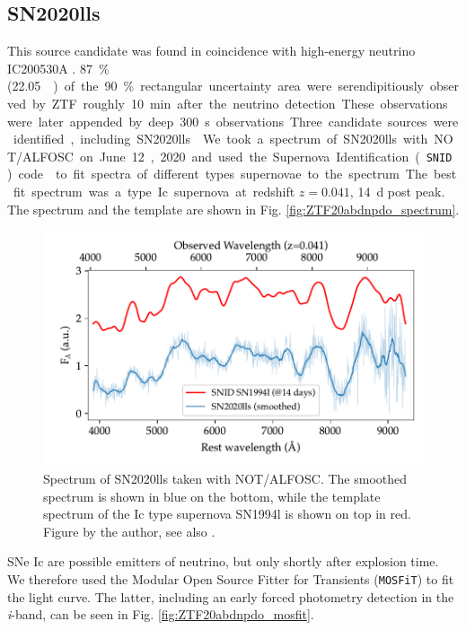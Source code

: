 \documentclass[
    a4paper, %
    fontsize=10pt, %
    twoside=true, %
    numbers=noenddot, %
    fontmethod=tex,
]{kaobook}
\begin{document}
\subsection{SN2020lls} \label{SN2020lls}
This source candidate was found in coincidence with high-energy neutrino IC200530A . \SI{87}{\percent} (\SI{22.05}{\square\deg}) of the \SI{90}{\percent} rectangular uncertainty area were serendipitiously observed by ZTF roughly \SI{10}{\minute} after the neutrino detection. These observations were later appended by deep \SI{300}{\second} observations Three candidate sources were identified, including SN2020lls . 

We took a spectrum of SN2020lls with NOT/ALFOSC on June 12, 2020 and used the Supernova Identification (\texttt{SNID}) code  to fit spectra of different types supernovae to the spectrum. The best fit spectrum was a type Ic supernova at redshift $z=0.041$, \SI{14}{\day} post peak. The spectrum and the template are shown in Fig. \ref{fig:ZTF20abdnpdo_spectrum}. 

\begin{figure}[h!]
    \includegraphics[width=1\textwidth]{fu/ZTF20abdnpdo_not_spectrum.pdf}
    \caption[SN2020lls spectrum]{Spectrum of SN2020lls taken with NOT/ALFOSC. The smoothed spectrum is shown in blue on the bottom, while the template spectrum of the Ic type supernova SN1994l is shown on top in red. Figure by the author, see also \cite{Stein2023a}.}
\end{figure}
SNe Ic are possible emitters of neutrino, but only shortly after explosion time. We therefore used the Modular Open Source Fitter for Transients (\texttt{MOSFiT})  to fit the light curve. The latter, including an early forced photometry detection in the \textit{i}-band, can be seen in Fig. \ref{fig:ZTF20abdnpdo_mosfit}.
\end{document}
